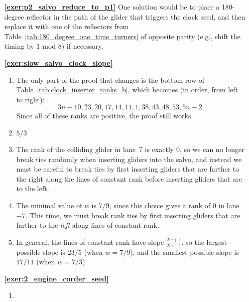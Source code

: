 \begin{multicols}{2}
\begin{itemize}[leftmargin=0em]
		
		\item[\bf\color{ocre}\sffamily\ref{exer:p2_salvo_reduce_to_p1}] One solution would be to place a 180-degree reflector in the path of the glider that triggers the clock seed, and then replace it with one of the reflectors from Table~\ref{tab:180_degree_one_time_turners} of opposite parity (e.g., shift the timing by $1$ mod $8$) if necessary.\\
		
		
		\item[\bf\color{ocre}\sffamily\ref{exer:slow_salvo_clock_slope}]
		\begin{enumerate}[leftmargin=1.5em,label=\bf\color{ocre}(\alph*)]
			\item The only part of the proof that changes is the bottom row of Table~\ref{tab:clock_inserter_ranks_b}, which becomes (in order, from left to right): $$3n-10, 23, 20, 17, 14, 11, 1, 38, 43, 48, 53, 5n-2.$$ Since all of these ranks are positive, the proof still works. \\
			
			\item $5/3$ \\
			
			\item The rank of the colliding glider in lane~7 is exactly $0$, so we can no longer break ties randomly when inserting gliders into the salvo, and instead we must be careful to break ties by first inserting gliders that are farther to the right along the lines of constant rank before inserting gliders that are to the left. \\
			
			\item The minimal value of $w$ is $7/9$, since this choice gives a rank of $0$ in lane $-7$. This time, we must break rank ties by first inserting gliders that are farther to the \emph{left} along lines of constant rank. \\
			
			\item In general, the lines of constant rank have slope $\frac{2w+1}{2w-1}$, so the largest possible slope is $23/5$ (when $w = 7/9$), and the smallest possible slope is $17/11$ (when $w = 7/3$). \\
		\end{enumerate}
		
		
		\item[\bf\color{ocre}\sffamily\ref{exer:2_engine_corder_seed}]
		\begin{enumerate}[leftmargin=1.5em,label=\bf\color{ocre}(\alph*)]
			\item {} \\
			

\end{enumerate}
\end{itemize}
\end{multicols}
